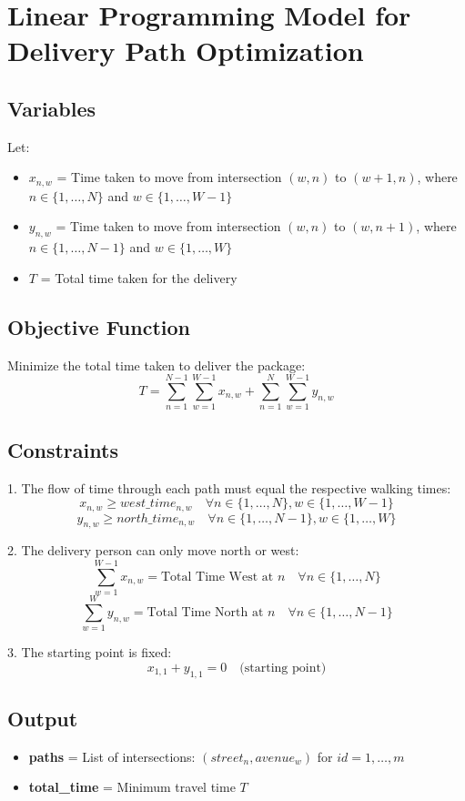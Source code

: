 \documentclass{article}
\begin{document}
\section*{Linear Programming Model for Delivery Path Optimization}

\subsection*{Variables}
Let:
\begin{itemize}
    \item $x_{n,w}$ = Time taken to move from intersection $(w, n)$ to $(w+1, n)$, where $n \in \{1, \ldots, N\}$ and $w \in \{1, \ldots, W-1\}$
    \item $y_{n,w}$ = Time taken to move from intersection $(w, n)$ to $(w, n+1)$, where $n \in \{1, \ldots, N-1\}$ and $w \in \{1, \ldots, W\}$
    \item $T$ = Total time taken for the delivery
\end{itemize}

\subsection*{Objective Function}
Minimize the total time taken to deliver the package:
\[
T = \sum_{n=1}^{N-1} \sum_{w=1}^{W-1} x_{n,w} + \sum_{n=1}^{N} \sum_{w=1}^{W-1} y_{n,w}
\]

\subsection*{Constraints}

1. The flow of time through each path must equal the respective walking times:
   \[
   x_{n,w} \geq west\_time_{n,w} \quad \forall n \in \{1, \ldots, N\}, w \in \{1, \ldots, W-1\}
   \]
   \[
   y_{n,w} \geq north\_time_{n,w} \quad \forall n \in \{1, \ldots, N-1\}, w \in \{1, \ldots, W\}
   \]

2. The delivery person can only move north or west:
   \[
   \sum_{w=1}^{W-1} x_{n,w} = \text{Total Time West at } n \quad \forall n \in \{1, \ldots, N\}
   \]
   \[
   \sum_{w=1}^{W} y_{n,w} = \text{Total Time North at } n \quad \forall n \in \{1, \ldots, N-1\}
   \]

3. The starting point is fixed:
   \[
   x_{1,1} + y_{1,1} = 0 \quad \text{(starting point)}
   \]

\subsection*{Output}
\begin{itemize}
    \item \textbf{paths} = List of intersections: $(street_{n}, avenue_{w})$ for $id = 1, \ldots, m$
    \item \textbf{total\_time} = Minimum travel time $T$
\end{itemize}
\end{document}
